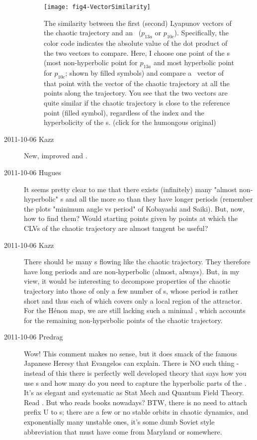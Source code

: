 \begin{description}
\begin{figure}
\texttt{[image: fig4-VectorSimilarity]}
\caption{
The similarity between the first (second) Lyapunov vectors of the
chaotic trajectory and an \po\ ($p_{13a}$ or $p_{10c}$). Specifically, the color
code indicates the absolute value of the dot product of the two vectors
to compare. Here, I choose one point of the \po s (most non-hyperbolic
point for $p_{13a}$ and most hyperbolic point for $p_{10c}$; shown by filled
symbols) and compare a \po\ vector of that point with the vector of the
chaotic trajectory at all the points along the trajectory. You see that
the two vectors are quite similar if the chaotic trajectory is close to
the reference point (filled symbol), regardless of the index and the
hyperbolicity of the \po s.
(click  for
the humongous original)
}
\label{fig4-VectorSimilarity}
\end{figure}


\item[2011-10-06 Kazz]
New, improved  and .

\item[2011-10-06 Hugues]
It seems pretty clear to me that there exists (infinitely) many "almost
non-hyperbolic" \po s and all the more so than they have longer periods
(remember the plots "minimum angle vs period" of Kobayashi and Saiki).
But, now, how to find them? Would starting points given by points at
which the CLVs of the chaotic trajectory are almost tangent be useful?

\item[2011-10-06 Kazz]
There should be many \po s flowing like the chaotic trajectory. They
therefore have long periods and are non-hyperbolic (almost, always). But,
in my view, it would be interesting to decompose properties of the
chaotic trajectory into those of only a few number of \po s, whose period
is rather short and thus each of which covers only a local region of the
attractor. For the H\'enon map, we are still lacking such a minimal \po,
which accounts for the remaining non-hyperbolic points of the chaotic
trajectory.

\item[2011-10-06 Predrag]
Wow! This comment makes no sense, but it does smack of the famous
Japanese Heresy that Evangelos can explain. There is NO such thing -
instead of this there is perfectly well developed theory that says how
you use \po s and how many do you need to capture the hyperbolic parts of
the {\nws}. It's as elegant and systematic as Stat Mech and Quantum Field
Theory. Read . But who reads books
nowadays? BTW, there is no need to attach prefix U to \po s; there are a
few or no stable orbits in chaotic dynamics, and exponentially many
unstable ones, it's some dumb Soviet style abbreviation that must have
come from Maryland or somewhere.


\end{description}
